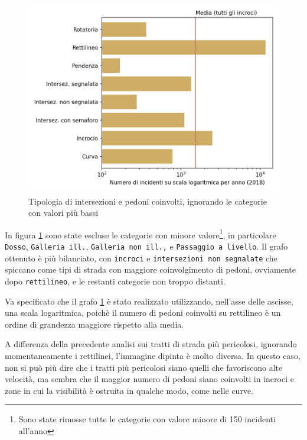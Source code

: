 \documentclass[a4paper,12pt]{report}
\newcommand{\columnstyle}[1]{\texttt{#1}}
\begin{document}
\begin{figure}
    \includegraphics[width=\linewidth]{../src/incidenti/incidenti_senza_coords/pedoni/pedoni_no_rett.png}
    \caption{Tipologia di intersezioni e pedoni coinvolti, ignorando le categorie con valori più bassi}
    \label{fig:pedoni-no-rett}
\end{figure}

In figura \ref{fig:pedoni-no-rett} sono state escluse le categorie con minore 
valore\footnote{Sono state rimosse tutte le categorie con valore minore di 
150 incidenti all'anno}, 
in particolare \columnstyle{Dosso}, \columnstyle{Galleria ill.}, 
\columnstyle{Galleria non ill.,} e \columnstyle{Passaggio a livello}.
Il grafo ottenuto è più bilanciato, con \columnstyle{incroci} e 
\columnstyle{intersezioni non segnalate} che spiccano come tipi di strada con 
maggiore coinvolgimento di pedoni, ovviamente dopo \columnstyle{rettilineo}, 
e le restanti categorie non troppo distanti.

Va specificato che il grafo \ref{fig:pedoni-no-rett} è stato realizzato utilizzando, 
nell'asse delle ascisse, una scala logaritmica, poichè il numero di pedoni coinvolti 
su rettilineo è un ordine di grandezza maggiore rispetto alla media.

A differenza della precedente analisi sui tratti di strada più pericolosi, 
ignorando momentaneamente i rettilinei, l'immagine dipinta è molto diversa.
In questo caso, non si può più dire che i tratti più pericolosi siano quelli 
che favoriscono alte velocità, ma sembra che il maggior numero di pedoni 
siano coinvolti in incroci e zone in cui la visibilità è ostruita in 
qualche modo, come nelle curve.
\end{document}
